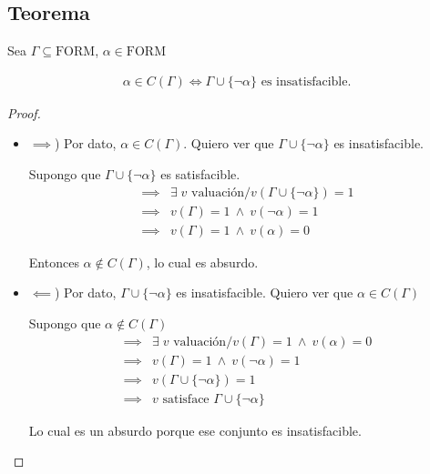 \subsection{Teorema}

%
\begin{teorema}{}{}
    Sea $\Gamma \subseteq \mathrm{FORM}$, $\alpha \in \mathrm{FORM}$

    \medskip

    \begin{gather*}
        \alpha \in C(\Gamma) \iff 
        \Gamma \cup \{ \neg \alpha \} \text{ es insatisfacible.}
    \end{gather*}
\end{teorema}

\begin{proof} \phantom{.}

    \begin{itemize}
        \item $\implies$) Por dato, $\alpha \in C(\Gamma)$. Quiero ver que
            $\Gamma \cup \{ \neg \alpha \}$ es insatisfacible.

            Supongo que $\Gamma \cup \{ \neg \alpha \}$ es satisfacible.
            \begin{align*}
                \implies& \exists  \; v \text{ valuación}/
                v\left(\Gamma \cup \{ \neg\alpha \}\right) = 1 \\
                \implies& v(\Gamma) = 1 ~ \wedge ~ v(\neg \alpha) = 1 \\
                \implies& v(\Gamma) = 1 ~ \wedge ~ v(\alpha) = 0
            \end{align*}

            Entonces $\alpha \notin C(\Gamma)$, lo cual es absurdo.

        \item $\impliedby$) Por dato, $\Gamma \cup \{ \neg\alpha \}$ es
            insatisfacible. Quiero ver que $\alpha \in C(\Gamma)$

            Supongo que $\alpha \notin C(\Gamma)$
            \begin{align*}
                \implies& \exists \; v \text{ valuación}/ v(\Gamma)=1 
                ~ \wedge ~ v(\alpha)= 0 \\
                \implies& v(\Gamma) = 1 ~ \wedge ~ v(\neg \alpha)=1 \\
                \implies& v(\Gamma \cup \{ \neg \alpha \}) = 1 \\
                \implies& v \text{ satisface } \Gamma \cup \{ \neg\alpha \}
            \end{align*}

            Lo cual es un absurdo porque ese conjunto es insatisfacible.
    \end{itemize}
\end{proof}

